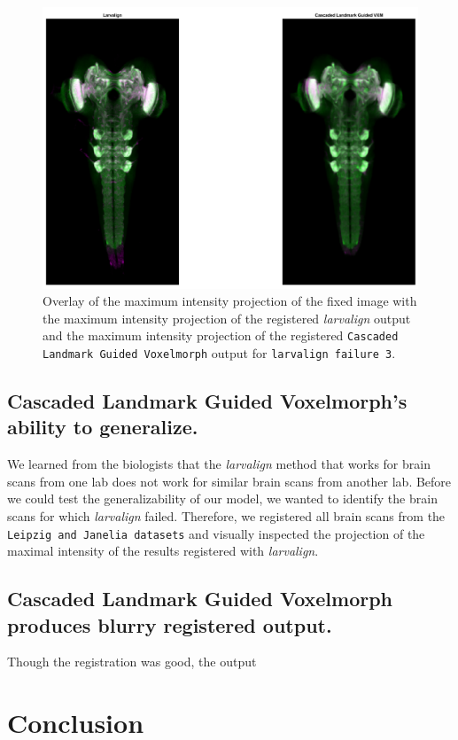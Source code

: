 \documentclass{book}
\begin{document}
	\begin{figure}[h!]
		\centering
		\includegraphics[width=0.8\columnwidth]{resources/Chapter7/LRE_Visual/60a07.png}
		\caption{Overlay of the maximum intensity projection of the fixed image with the maximum intensity projection of the registered \textit{larvalign} output and the maximum intensity projection of the registered \texttt{Cascaded Landmark Guided Voxelmorph} output for \texttt{larvalign failure 3}.}
		\label{fig:larvalign failure 3}
	\end{figure}
	
	\section{Cascaded Landmark Guided Voxelmorph's ability to generalize.}
	We learned from the biologists that the \textit{larvalign} method that works for brain scans from one lab does not work for similar brain scans from another lab. Before we could test the generalizability of our model, we wanted to identify the brain scans for which \textit{larvalign} failed. Therefore, we registered all brain scans from the \texttt{Leipzig and Janelia datasets} and visually inspected the projection of the maximal intensity of the results registered with \textit{larvalign}.
	
	
	\section{Cascaded Landmark Guided Voxelmorph produces blurry registered output.}
	Though the registration was good, the output 
	
	\chapter{Conclusion}
	
\end{document}
